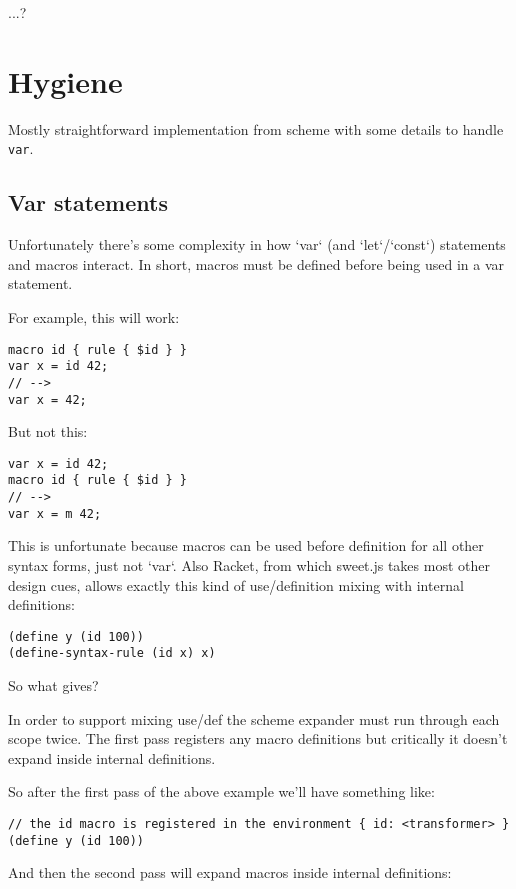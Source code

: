 \documentclass[onecolumn]{sigplanconf-onecolumn}
\begin{document}
...?

\section{Hygiene}
\label{sec-5}

Mostly straightforward implementation from scheme with some details to
handle \texttt{var}.

\subsection{Var statements} 

Unfortunately there's some complexity in how `var` (and `let`/`const`)
statements and macros interact. In short, macros must be defined
before being used in a var statement.

For example, this will work:

\begin{lstlisting}
macro id { rule { $id } }
var x = id 42;
// -->
var x = 42;
\end{lstlisting}

But not this:

\begin{lstlisting}
var x = id 42;
macro id { rule { $id } }
// -->
var x = m 42;
\end{lstlisting}

This is unfortunate because macros can be used before definition for
all other syntax forms, just not `var`. Also Racket, from which sweet.js
takes most other design cues, allows exactly this kind of use/definition
mixing with internal definitions:

\begin{lstlisting}
(define y (id 100))
(define-syntax-rule (id x) x)
\end{lstlisting}

So what gives?

In order to support mixing use/def the scheme expander must run
through each scope twice. The first pass registers any macro definitions
but critically it doesn't expand inside internal definitions.

So after the first pass of the above example we'll have something like:

\begin{lstlisting}
// the id macro is registered in the environment { id: <transformer> }
(define y (id 100))
\end{lstlisting}

And then the second pass will expand macros inside internal definitions:
\end{document}
